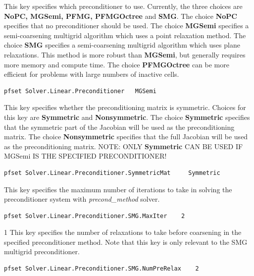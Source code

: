 {This key specifies which preconditioner to use.  Currently, the three choices
are {\bf NoPC, MGSemi, PFMG, PFMGOctree} and {\bf SMG}.  The choice {\bf NoPC} specifies that no
preconditioner should be used.  The choice {\bf MGSemi} specifies
a semi-coarsening multigrid algorithm which uses a point relaxation method.
The choice {\bf SMG} specifies a semi-coarsening multigrid algorithm which uses
plane relaxations.  This method is more robust than {\bf MGSemi}, but generally
requires more memory and compute time. The choice {\bf PFMGOctree} can be more efficient for problems with large numbers of inactive cells.
}
\begin{display}\begin{verbatim}
pfset Solver.Linear.Preconditioner   MGSemi
\end{verbatim}\end{display}


{This key specifies whether the preconditioning matrix is symmetric.
Choices for this key are {\bf Symmetric} and {\bf Nonsymmetric}.
The choice {\bf Symmetric} specifies that the symmetric part of the Jacobian
will be used as the preconditioning matrix.  The choice {\bf Nonsymmetric}
specifies that the full Jacobian will be used as the preconditioning matrix.
NOTE: ONLY {\bf Symmetric} CAN BE USED IF MGSemi IS THE SPECIFIED
PRECONDITIONER!
}
\begin{display}\begin{verbatim}
pfset Solver.Linear.Preconditioner.SymmetricMat     Symmetric
\end{verbatim}\end{display}

{This key specifies the maximum number of iterations to take in solving the
preconditioner system with {\em precond\_method} solver.
}
\begin{display}\begin{verbatim}
pfset Solver.Linear.Preconditioner.SMG.MaxIter    2
\end{verbatim}\end{display}

{1}
{This key specifies the number of relaxations to take before coarsening in the
specified preconditioner method.  Note that this key is only relevant to
the SMG multigrid preconditioner.
}
\begin{display}\begin{verbatim}
pfset Solver.Linear.Preconditioner.SMG.NumPreRelax    2
\end{verbatim}\end{display}

